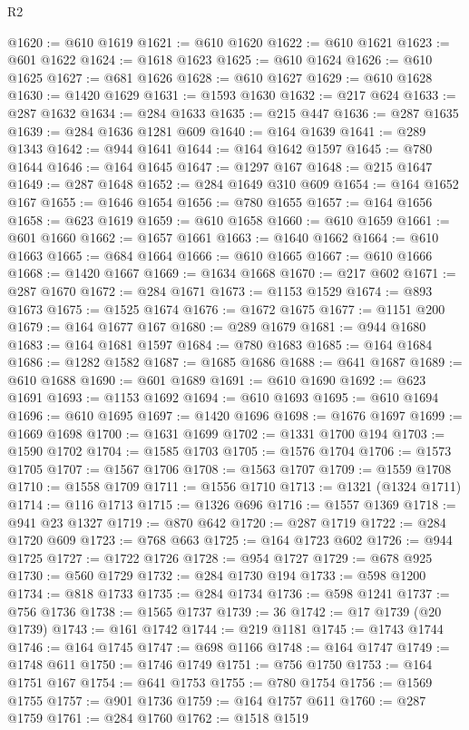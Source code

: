 \begin{lexlean}{R2}
\begin{coremodule}
@1620 := @610 @1619
@1621 := @610 @1620
@1622 := @610 @1621
@1623 := @601 @1622
@1624 := @1618 @1623
@1625 := @610 @1624
@1626 := @610 @1625
@1627 := @681 @1626
@1628 := @610 @1627
@1629 := @610 @1628
@1630 := @1420 @1629
@1631 := @1593 @1630
@1632 := @217 @624
@1633 := @287 @1632
@1634 := @284 @1633
@1635 := @215 @447
@1636 := @287 @1635
@1639 := @284 @1636 @1281 @609
@1640 := @164 @1639
@1641 := @289 @1343
@1642 := @944 @1641
@1644 := @164 @1642 @1597
@1645 := @780 @1644
@1646 := @164 @1645
@1647 := @1297 @167
@1648 := @215 @1647
@1649 := @287 @1648
@1652 := @284 @1649 @310 @609
@1654 := @164 @1652 @167
@1655 := @1646 @1654
@1656 := @780 @1655
@1657 := @164 @1656
@1658 := @623 @1619
@1659 := @610 @1658
@1660 := @610 @1659
@1661 := @601 @1660
@1662 := @1657 @1661
@1663 := @1640 @1662
@1664 := @610 @1663
@1665 := @684 @1664
@1666 := @610 @1665
@1667 := @610 @1666
@1668 := @1420 @1667
@1669 := @1634 @1668
@1670 := @217 @602
@1671 := @287 @1670
@1672 := @284 @1671
@1673 := @1153 @1529
@1674 := @893 @1673
@1675 := @1525 @1674
@1676 := @1672 @1675
@1677 := @1151 @200
@1679 := @164 @1677 @167
@1680 := @289 @1679
@1681 := @944 @1680
@1683 := @164 @1681 @1597
@1684 := @780 @1683
@1685 := @164 @1684
@1686 := @1282 @1582
@1687 := @1685 @1686
@1688 := @641 @1687
@1689 := @610 @1688
@1690 := @601 @1689
@1691 := @610 @1690
@1692 := @623 @1691
@1693 := @1153 @1692
@1694 := @610 @1693
@1695 := @610 @1694
@1696 := @610 @1695
@1697 := @1420 @1696
@1698 := @1676 @1697
@1699 := @1669 @1698
@1700 := @1631 @1699
@1702 := @1331 @1700 @194
@1703 := @1590 @1702
@1704 := @1585 @1703
@1705 := @1576 @1704
@1706 := @1573 @1705
@1707 := @1567 @1706
@1708 := @1563 @1707
@1709 := @1559 @1708
@1710 := @1558 @1709
@1711 := @1556 @1710
@1713 := @1321 (@1324 @1711)
@1714 := @116 @1713
@1715 := @1326 @696
@1716 := @1557 @1369
@1718 := @941 @23 @1327
@1719 := @870 @642
@1720 := @287 @1719
@1722 := @284 @1720 @609
@1723 := @768 @663
@1725 := @164 @1723 @602
@1726 := @944 @1725
@1727 := @1722 @1726
@1728 := @954 @1727
@1729 := @678 @925
@1730 := @560 @1729
@1732 := @284 @1730 @194
@1733 := @598 @1200
@1734 := @818 @1733
@1735 := @284 @1734
@1736 := @598 @1241
@1737 := @756 @1736
@1738 := @1565 @1737
@1739 := 36
@1742 := @17 @1739 (@20 @1739)
@1743 := @161 @1742
@1744 := @219 @1181
@1745 := @1743 @1744
@1746 := @164 @1745
@1747 := @698 @1166
@1748 := @164 @1747
@1749 := @1748 @611
@1750 := @1746 @1749
@1751 := @756 @1750
@1753 := @164 @1751 @167
@1754 := @641 @1753
@1755 := @780 @1754
@1756 := @1569 @1755
@1757 := @901 @1736
@1759 := @164 @1757 @611
@1760 := @287 @1759
@1761 := @284 @1760
@1762 := @1518 @1519

\end{coremodule}
\end{lexlean}
